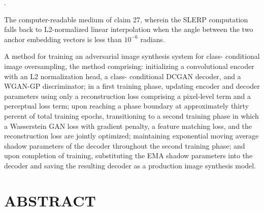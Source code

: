 \documentclass[12pt,letterpaper]{article}
\newcounter{claimnum}
\newenvironment{claims}{%
  \setcounter{claimnum}{0}
  \begin{list}{\arabic{claimnum}.}{%
    \usecounter{claimnum}
    \setlength{\leftmargin}{2em}
    \setlength{\labelsep}{0.5em}
    \setlength{\itemsep}{0pt}
    \setlength{\parsep}{6pt plus 2pt}
  }%
}{\end{list}}
\begin{document}
\begin{claims}
\item The computer-readable medium of claim 27, wherein the SLERP computation
falls back to L2-normalized linear interpolation when the angle between the
two anchor embedding vectors is less than $10^{-6}$ radians.

\item A method for training an adversarial image synthesis system for class-
conditional image oversampling, the method comprising:
initializing a convolutional encoder with an L2 normalization head, a class-
conditional DCGAN decoder, and a WGAN-GP discriminator;
in a first training phase, updating encoder and decoder parameters using only a
reconstruction loss comprising a pixel-level term and a perceptual loss term;
upon reaching a phase boundary at approximately thirty percent of total training
epochs, transitioning to a second training phase in which a Wasserstein GAN
loss with gradient penalty, a feature matching loss, and the reconstruction
loss are jointly optimized;
maintaining exponential moving average shadow parameters of the decoder
throughout the second training phase; and
upon completion of training, substituting the EMA shadow parameters into the
decoder and saving the resulting decoder as a production image synthesis model.

\end{claims}

\newpage
\section*{ABSTRACT}
\end{document}
